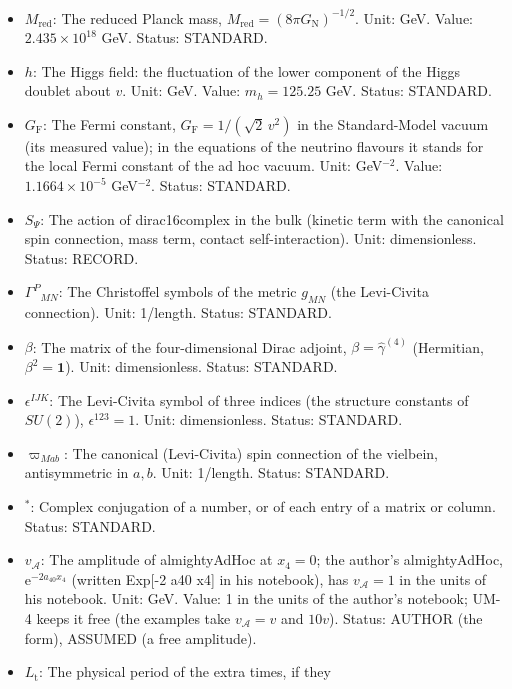 \documentclass[
  10pt,
]{article}
\providecommand{\tightlist}{%
  \setlength{\itemsep}{0pt}\setlength{\parskip}{0pt}}
\begin{document}
\begin{itemize}
\tightlist
\item
  \(M_{\mathrm{red}}\): The reduced Planck mass,
  \(M_{\mathrm{red}} = (8\pi G_{\mathrm{N}})^{-1/2}\). Unit: GeV. Value:
  \(2.435\times10^{18}\) GeV. Status: STANDARD.
\item
  \(h\): The Higgs field: the fluctuation of the lower component of the
  Higgs doublet about \(v\). Unit: GeV. Value: \(m_h = 125.25\) GeV.
  Status: STANDARD.
\item
  \(G_{\mathrm{F}}\): The Fermi constant,
  \(G_{\mathrm{F}} = 1/(\sqrt2\,v^2)\) in the Standard-Model vacuum (its
  measured value); in the equations of the neutrino flavours it stands
  for the local Fermi constant of the ad hoc vacuum. Unit: GeV\(^{-2}\).
  Value: \(1.1664\times10^{-5}\) GeV\(^{-2}\). Status: STANDARD.
\item
  \(S_\Psi\): The action of dirac16complex in the bulk (kinetic term
  with the canonical spin connection, mass term, contact
  self-interaction). Unit: dimensionless. Status: RECORD.
\item
  \(\Gamma^P{}_{MN}\): The Christoffel symbols of the metric \(g_{MN}\)
  (the Levi-Civita connection). Unit: 1/length. Status: STANDARD.
\item
  \(\beta\): The matrix of the four-dimensional Dirac adjoint,
  \(\beta = \hat\gamma^{(4)}\) (Hermitian, \(\beta^2 = \mathbf{1}\)).
  Unit: dimensionless. Status: STANDARD.
\item
  \(\epsilon^{IJK}\): The Levi-Civita symbol of three indices (the
  structure constants of \(SU(2)\)), \(\epsilon^{123} = 1\). Unit:
  dimensionless. Status: STANDARD.
\item
  \(\varpi_{Mab}\): The canonical (Levi-Civita) spin connection of the
  vielbein, antisymmetric in \(a, b\). Unit: 1/length. Status: STANDARD.
\item
  \({}^*\): Complex conjugation of a number, or of each entry of a
  matrix or column. Status: STANDARD.
\item
  \(v_{\mathcal{A}}\): The amplitude of almightyAdHoc at \(x_4 = 0\);
  the author's almightyAdHoc, \(\mathrm{e}^{-2a_{40}x_4}\) (written
  Exp{[}-2 a40 x4{]} in his notebook), has \(v_{\mathcal{A}} = 1\) in
  the units of his notebook. Unit: GeV. Value: 1 in the units of the
  author's notebook; UM-4 keeps it free (the examples take
  \(v_{\mathcal{A}} = v\) and \(10v\)). Status: AUTHOR (the form),
  ASSUMED (a free amplitude).
\item
  \(L_{\mathrm{t}}\): The physical period of the extra times, if they

\end{itemize}
\end{document}
